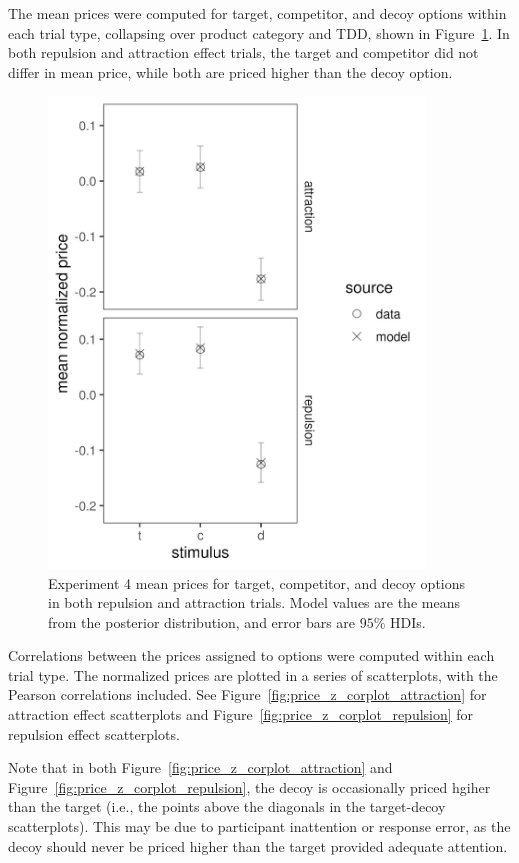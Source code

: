 The mean prices were computed for target, competitor, and decoy options within each trial type, collapsing over product category and TDD, shown in Figure~\ref{fig:price_mu_model_data}. In both repulsion and attraction effect trials, the target and competitor did not differ in mean price, while both are priced higher than the decoy option.

\begin{figure}
    \includegraphics[scale=0.5, width=100mm]{figures/pricing_mu_model_data.jpeg}
    \caption{Experiment 4 mean prices for target, competitor, and decoy options in both repulsion and attraction trials. Model values are the means from the posterior distribution, and error bars are $95\%$ HDIs.}
    \label{fig:price_mu_model_data}
\end{figure}

Correlations between the prices assigned to options were computed within each trial type. The normalized prices are plotted in a series of scatterplots, with the Pearson correlations included. See Figure~\ref{fig:price_z_corplot_attraction} for attraction effect scatterplots and Figure~\ref{fig:price_z_corplot_repulsion} for repulsion effect scatterplots.

Note that in both Figure~\ref{fig:price_z_corplot_attraction} and Figure~\ref{fig:price_z_corplot_repulsion}, the decoy is occasionally priced hgiher than the target (i.e., the points above the diagonals in the target-decoy scatterplots). This may be due to participant inattention or response error, as the decoy should never be priced higher than the target provided adequate attention. 

